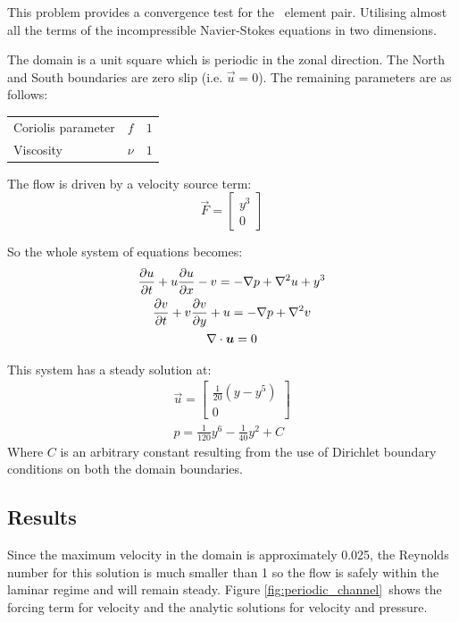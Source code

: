 This problem provides a convergence test for the \PoDGPt\ element pair.
Utilising almost all the terms of the incompressible Navier-Stokes equations
in two dimensions.

The domain is a unit square which is periodic in the zonal direction. The
North and South boundaries are zero slip (i.e. $\vec{u}=0$). The remaining
parameters are as follows:

\begin{tabular}{lll}
  Coriolis parameter & $f$ & $1$ \\
  Viscosity & $\nu$ & $1$
\end{tabular}

The flow is driven by a velocity source term:
\begin{equation}
  \vec{F}=
  \begin{bmatrix}
    y^3 \\
    0
  \end{bmatrix}
\end{equation}

So the whole system of equations becomes:
\begin{gather}
  \ppt{u}+u\ppt[x]{u}-v=-\grad p + \grad^2 u +y^3\\
  \ppt{v}+v\ppt[y]{v}+u=-\grad p + \grad^2 v\\
  \div\vec{u}=0
\end{gather}

This system has a steady solution at:
\begin{gather}
  \vec{u}=
  \begin{bmatrix}
    \frac{1}{20}(y-y^5)\\
    0
  \end{bmatrix}\\
  p=\frac{1}{120}y^6-\frac{1}{40}y^2+C
\end{gather}
Where $C$ is an arbitrary constant resulting from the use of Dirichlet
boundary conditions on both the domain boundaries.

\subsection{Results}

Since the maximum velocity in the domain is approximately 0.025, the
Reynolds number for this solution is much smaller than 1 so the flow is
safely within the laminar regime and will remain steady. Figure
\ref{fig:periodic_channel}\ shows the forcing term for velocity and the
analytic solutions for velocity and pressure.


